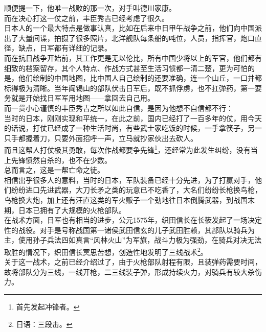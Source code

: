 \begin{multicols}{\theparacolNo}
顺便提一下，他唯一战败的那一次，对手叫德川家康。\\

而在决心打这一仗之前，丰臣秀吉已经考虑了很久。\\

日本人的一个最大特点是做事认真，比如在后来中日甲午战争之前，他们向中国派出了大量间谍，拍摄了很多照片，北洋舰队每条船的吨位，人员，指挥官，炮口直径，缺点，日军都有详细的记录。\\

而在抗日战争开始前，其工作更是无以伦比，所有中国少将以上的军官，他们都有细致的档案留存，其个人特点、作战方式甚至生活习惯都一清二楚，更为可怕的是，他们绘制的中国地图，比中国人自己绘制的还要准确，连一个山丘，一口井都标得极为清晰。当年阎锡山的部队伏击日军后，既不抓俘虏，也不扛弹药，第一要务就是开始找日军军用地图——拿回去自己用。\\

而一贯小心谨慎的丰臣秀吉之所以如此自信，是因为他想不自信都不行：\\

当时的日本，刚刚实现和平统一，在此之前，国内已经打了一百多年的仗，用今天的话说，打仗已经成了一种生活时尚，有些武士家吃饭的时候，一手拿筷子，另一只手都握着刀，只要外面招呼一声，立马就抄家伙出去砍人。\\

而且这帮人打仗极其勇敢，每次作战都要争先锋\footnote{首先发起冲锋者。}，还经常为此发生纠纷，没有当上先锋愤然自杀的，也不在少数。\\

总而言之，这是一帮亡命之徒。\\

相信出乎很多人的意料，当时的日本，军队装备已经十分先进，为了打赢对手，他们纷纷进口先进武器，大刀长矛之类的玩意已不吃香了，大名们纷纷长枪换鸟枪，鸟枪换大炮，加上还有汪直这类的军火贩子一个劲地往日本倒腾武器，到战国末期，日本已拥有了大规模的火枪部队。\\

在战术方面，日军也有相当的进步，公元1575年，织田信长在长筱发起了一场决定性的战役。对手是号称战国第一诸侯武田信玄的儿子武田胜赖，其部队以骑兵为主，使用孙子兵法四如真言“风林火山”为军旗，战斗力极为强劲，在骑兵对决无法取胜的情况下，织田信长冥思苦想，创造性地发明了三线战术\footnote{日语：三段击。}。\\

关于这一战术，之前已经介绍过了，由于火枪部队射程有限，且装弹药需要时间，故将部队分为三线，一线开枪，二三线装子弹，形成持续火力，对骑兵有较大杀伤力。\\


\end{multicols}
